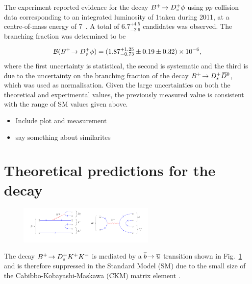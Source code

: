 {\color{Blue}
The \lhcb experiment reported evidence for the decay ${{{B}^+}}\!\rightarrow {\ensuremath{{D}^+_{s}}}\phi$ using $pp$ collision data corresponding to an integrated luminosity of 1\invfb taken during 2011, at a centre-of-mass energy of 7\tev~\cite{Aaij:2012zh}. A total of $6.7^{+4.5}_{-2.6}$ candidates was observed. The branching fraction was determined to be 

\begin{equation}
\mathcal{B}({{{B}^+}}\!\rightarrow {\ensuremath{{D}^+_{s}}}\phi) = (1.87^{+1.25}_{-0.73} \pm 0.19 \pm 0.32) \times 10^{-6},
\end{equation}
where the first uncertainty is statistical, the second is systematic and the third is due to the uncertainty on the branching fraction of the decay ${{{B}^+}}\!\rightarrow {\ensuremath{{D}^+_{s}}}{\ensuremath{{\kern 0.2em\overline{\kern -0.2em D}{}}{}^0}}$, which was used as normalisation. 
Given the large uncertainties on both the theoretical and experimental values, the previously measured value is consistent with the range of SM values given above.
}

{\color{Red}
\begin{itemize}
\item Include plot and measurement
\item say something about similarites 
\end{itemize}}


\section{Theoretical predictions for the \decay{\Bp}{\Dsp\Kp\Km} decay}


\begin{figure}[!h]
    \centering
    \includegraphics[width=0.6\textwidth]{figs/Theory/B2DsKK.pdf}
    \caption{\decay{\Bp}{\Dsp\Kp\Km} }
    \label{fig:Theory_DsKKDiagram}   
\end{figure}



{\color{Blue}
The decay ${{{B}^+}}\!\rightarrow {\ensuremath{{D}^+_{s}}}{\ensuremath{{K}^+}}{\ensuremath{{K}^-}}$ is mediated by a ${\overline {{b}}}\!\rightarrow {\ensuremath{\overline {{u}}}}$ transition shown in Fig.~\ref{fig:Theory_DsKKDiagram} and is therefore suppressed in the Standard Model (SM) due to the small size of the Cabibbo-Kobayashi-Maskawa (CKM) matrix element \Vub. 
}


